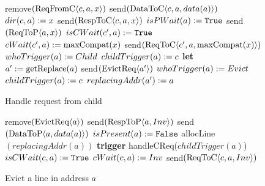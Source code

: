 \begin{figure}
\begin{algorithmic}
           \State remove$(\text{ReqFromC$\langle c,a,x\rangle$})$
              \State send$(\text{DataToC$\langle c,a,data(a)\rangle$})$
           \EndIf
           \State $dir(c, a) := x$
           \State send$(\text{RespToC$\langle c,a,x\rangle$})$
        \Else
              \State $isPWait(a) := \texttt{True}$
              \State send$(\text{ReqToP$\langle a,x\rangle$})$
           \EndIf
                 \State $isCWait(c', a) := \texttt{True}$
                 \State $cWait(c', a) := \text{maxCompat}(x)$
                 \State send$(\text{ReqToC$\langle c',a,\text{maxCompat}(x)\rangle$})$
              \EndIf
           \EndFor
           \State \textcolor{trig-color}{$whoTrigger(a) := Child$}
           \State \textcolor{trig-color}{$childTrigger(a) := c$}
        \EndIf
     \EndIf
  \Else
     \State \textbf{let} $a' := \text{getReplace}(a)$
        \State send$(\text{EvictReq$\langle a'\rangle$})$
        \State \textcolor{trig-color}{$whoTrigger(a) := Evict$}
        \State \textcolor{trig-color}{$childTrigger(a) := c$}
        \State $replacingAddr(a') := a$
     \EndIf
  \EndIf
\EndRule
\end{algorithmic}
\caption{Handle request from child}
\label{alg:handleCReq}
\end{figure}

\begin{figure}
\begin{algorithmic}
      \State remove$(\text{EvictReq$\langle a\rangle$})$
         \State send$(\text{RespToP$\langle a,\text{$Inv$}\rangle$})$
            \State send$(\text{DataToP$\langle a,data(a)\rangle$})$
         \EndIf
      \EndIf
      \State $isPresent(a) := \texttt{False}$
      \State allocLine$(replacingAddr(a))$
      \State \textcolor{trig-color}{\textbf{trigger} handleCReq($childTrigger(a)$)}
   \Else
               \State $isCWait(c, a) := \texttt{True}$
               \State $cWait(c, a) := \text{$Inv$}$
               \State send$(\text{ReqToC$\langle c,a,\text{$Inv$}\rangle$})$
            \EndIf
         \EndFor
      \EndIf
   \EndIf
\EndRule
\end{algorithmic}
\caption{Evict a line in address $a$}
\label{alg:handleEvict}
\end{figure}

